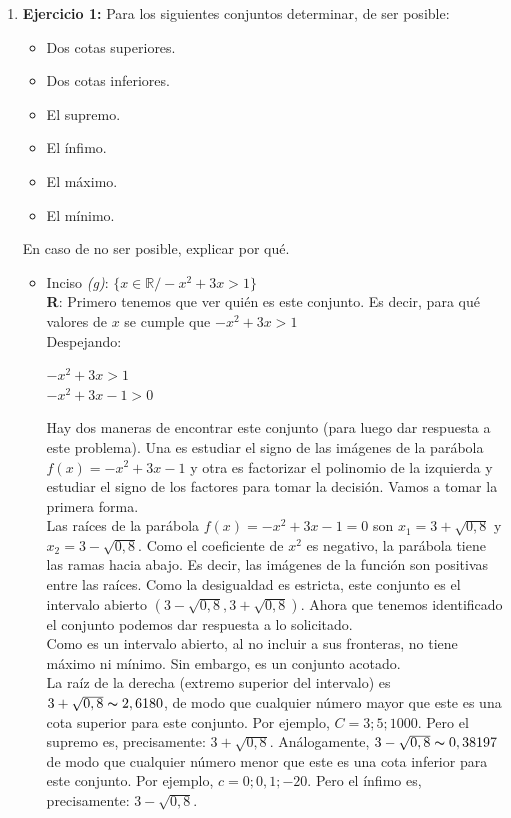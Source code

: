 \documentclass[12pt]{article}
\theoremstyle{definition}
\begin{document}
\begin{enumerate}
\item \textbf{Ejercicio 1:} Para los siguientes conjuntos determinar, de ser posible:
\begin{multicols}{3}
\begin{itemize}
\setlength\itemsep{0em}
\item Dos cotas superiores.	
\item Dos cotas inferiores.		
\item El supremo.	
\item El ínfimo.
\item El máximo.
\item El mínimo.
\end{itemize}
\end{multicols}
En caso de no ser posible, explicar por qué.
\begin{itemize}
\setlength\itemsep{0em}
\item Inciso \textit{(g)}: $\{x \in \mathbb{R} / -x^2+ 3x > 1\}$\\
\textbf{R}: Primero tenemos que ver quién es este conjunto. Es decir, para qué valores de $x$ se cumple que $ -x^2+ 3x > 1$\\
\noindent
Despejando:

\begin{centering}
$ -x^2+ 3x > 1$\\
$ -x^2+ 3x - 1>0$\\
\end{centering}
\vspace{0.3cm}

Hay dos maneras de encontrar este conjunto (para luego dar respuesta a este problema). Una es estudiar el signo de las imágenes de la parábola $f(x)=   -x^2+ 3x - 1$ y otra es factorizar el polinomio de la izquierda y estudiar el signo de los factores para tomar la decisión. Vamos a tomar la primera forma.\\
Las raíces de la parábola $f(x)= -x^2+ 3x - 1=0$ son $x_1= 3+ \sqrt{0,8}$ y  $x_2= 3- \sqrt{0,8}$. Como el coeficiente de  $x^2$ es negativo, la parábola tiene las ramas hacia abajo. Es decir, las imágenes de la función son positivas entre las raíces. Como la desigualdad es estricta, este conjunto es el intervalo abierto $(3- \sqrt{0,8}, 3+ \sqrt{0,8})$.  Ahora que tenemos identificado el conjunto podemos dar respuesta a lo solicitado.\\
Como es un intervalo abierto, al no incluir a sus fronteras, no tiene máximo ni mínimo. Sin embargo, es un conjunto acotado. \\
La raíz de la derecha (extremo superior del intervalo) es $3+ \sqrt{0,8}  \thicksim 2,6180$, de modo que cualquier número mayor que este es una cota superior para este conjunto. Por ejemplo, $C = 3; 5; 1000$. Pero el supremo es, precisamente: $3+ \sqrt{0,8}$. Análogamente, $3- \sqrt{0,8}  \thicksim 0,38197$ de modo que cualquier número menor que este es una cota inferior para este conjunto. Por ejemplo, $c = 0; 0,1; -20$. Pero el ínfimo es, precisamente: $3- \sqrt{0,8}$. 


\end{itemize}
\end{enumerate}
\end{document}
